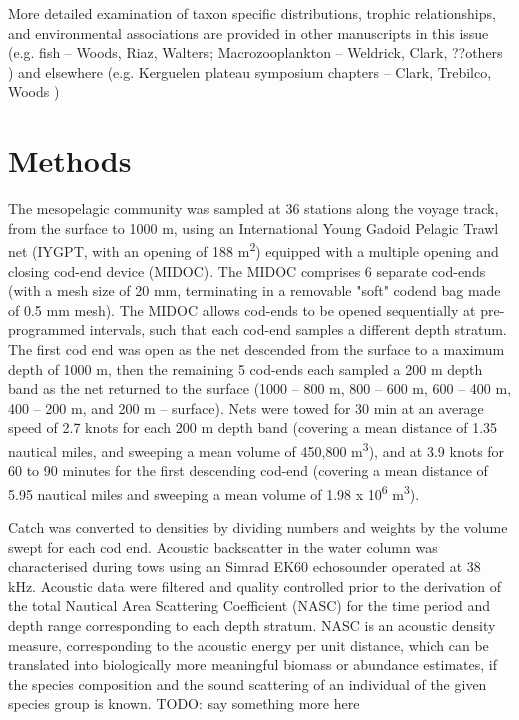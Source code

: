 \documentclass[12pt]{article}
\begin{document}
{More detailed examination of taxon specific distributions, trophic relationships, and environmental associations are provided in other manuscripts in this issue (e.g.
fish -- Woods, Riaz, Walters;  
Macrozooplankton -- Weldrick, Clark, ??others
)
and elsewhere (e.g.
Kerguelen plateau symposium chapters -- Clark, Trebilco, Woods
)


\section{Methods}



The mesopelagic community was sampled at 36 stations along the voyage track, from the surface to 1000 m, using an International Young Gadoid Pelagic Trawl net (IYGPT, with an opening of 188 m\textsuperscript{2}) equipped with a multiple opening and closing cod-end device (MIDOC). 
The MIDOC comprises 6 separate cod-ends (with a mesh size of 20 mm, terminating in a removable "soft" codend bag made of 0.5 mm mesh). 
The MIDOC allows cod-ends to be opened sequentially at pre-programmed intervals, such that each cod-end samples a different depth stratum.
The first cod end was open as the net descended from the surface to a maximum depth of 1000 m, then the remaining 5 cod-ends each sampled a 200 m depth band as the net returned to the surface (1000 – 800 m, 800 – 600 m, 600 – 400 m, 400 – 200 m, and 200 m – surface).
Nets were towed for 30 min at an average speed of 2.7 knots for each 200 m depth band (covering a mean distance of 1.35 nautical miles, and sweeping a mean volume of 450,800 m\textsuperscript{3}), and at 3.9 knots for 60 to 90 minutes for the first descending cod-end (covering a mean distance of 5.95 nautical miles and sweeping a mean volume of 1.98 x 10\textsuperscript{6} m\textsuperscript{3}). 


Catch was converted to densities by dividing numbers and weights by the volume swept for each cod end. Acoustic backscatter in the water column was characterised during tows using an Simrad EK60 echosounder operated at 38 kHz.
Acoustic data were filtered and quality controlled prior to the derivation of the total Nautical Area Scattering Coefficient (NASC) for the time period and depth range corresponding to each depth stratum. NASC is an acoustic density measure, corresponding to the acoustic energy per unit distance, which can be translated into biologically more meaningful biomass or abundance estimates, if the species composition and the sound scattering of an individual of the given species group is known.
TODO: say something more here


}
\end{document}
